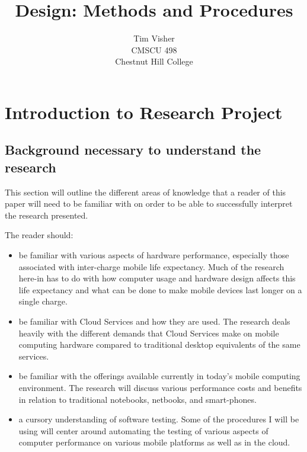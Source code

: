 \documentclass[12pt,oneside,letterpaper,titlepage]{article}
\author{Tim Visher\\ CMSCU 498\\ Chestnut Hill College}
\title{Design: Methods and Procedures}
\begin{document}
\maketitle

\tableofcontents

\newpage

\section{Introduction to Research Project}

\subsection{Background necessary to understand the research}

This section will outline the different areas of knowledge that a reader of this
paper will need to be familiar with on order to be able to successfully
interpret the research presented.

The reader should:

\begin{itemize}

\item be familiar with various aspects of hardware performance, especially those
  associated with inter-charge mobile life expectancy.  Much of the research
  here-in has to do with how computer usage and hardware design affects this
  life expectancy and what can be done to make mobile devices last longer on a
  single charge.

\item be familiar with Cloud Services and how they are used.  The research deals
  heavily with the different demands that Cloud Services make on mobile
  computing hardware compared to traditional desktop equivalents of the same
  services.

\item be familiar with the offerings available currently in today's mobile
  computing environment.  The research will discuss various performance costs
  and benefits in relation to traditional notebooks, netbooks, and smart-phones.

\item a cursory understanding of software testing.  Some of the procedures I
  will be using will center around automating the testing of various aspects of
  computer performance on various mobile platforms as well as in the cloud.

\end{itemize}
\end{document}

